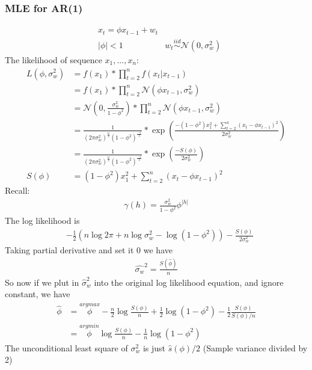 \subsubsection{MLE for AR(1)}
    \begin{align*}
        & x_t = \phi x_{t-1} + w_t\\
        & |\phi| < 1
        & w_t \overset{iid}{\sim} \mathcal{N}(0, \sigma_w^2)
    \end{align*}
The likelihood of sequence $x_1, ..., x_n$: 
    \begin{align*}
        L(\phi, \sigma_w^2) 
        & = f(x_1) * \prod_{t=2}^n f(x_t|x_{t-1})\\
        & = f(x_1) * \prod_{t=2}^n \mathcal{N}(\phi x_{t-1}, \sigma_w^2)\\
        & = \mathcal{N}(0, \frac{\sigma_w^2}{1-\phi^2}) *  \prod_{t=2}^n \mathcal{N}(\phi x_{t-1}, \sigma_w^2) \tag{use $\gamma(0)$}\\
        & = \frac{1}{(2\pi \sigma_w^2)^{\frac{n}{2}} (1-\phi^2)^\frac{-1}{2}} * \exp \left( \frac{ - (1-\phi^2)x_1^2 + \sum_{t=2}^n(x_t - \phi x_{t-1})^2}{2\sigma_w^2}    \right)\\
        & = \frac{1}{(2\pi \sigma_w^2)^{\frac{n}{2}} (1-\phi^2)^\frac{-1}{2}} * \exp \left( \frac{ - S(\phi)}{2\sigma_w^2}    \right) \\
        S(\phi) 
        & =   (1-\phi^2)x_1^2 + \sum_{t=2}^n(x_t - \phi x_{t-1})^2
    \end{align*}
Recall: 
    \begin{align*}
        \gamma(h) = \frac{\sigma_w^2}{1-\phi^2} \phi^{|h|}
    \end{align*}
The log likelihood is 
    \begin{align*}
        & - \frac{1}{2} (n \log 2\pi + n \log \sigma_w^2 - \log (1-\phi^2)) - \frac{S(\phi)}{2\sigma_w^2}
    \end{align*}
Taking partial derivative and set it 0 we have 
    \begin{align*}
        \hat{\sigma_w}^2 = \frac{S(\hat{\phi})}{n}
    \end{align*}
So now if we plut in $\hat{\sigma}_w^2$ into the original log likelihood equation, and ignore constant, we have 
    \begin{align*}
        \hat{\phi} 
        & = \overset{argmax}{\phi} - \frac{n}{2} \log \frac{S(\phi)}{n} + \frac{1}{2} \log (1-\phi^2) - \frac{1}{2}\frac{S(\phi)}{S(\phi)/n} \\
        & =\overset{argmin}{\phi}\log \frac{S(\phi)}{n} -  \frac{1}{n}\log (1-\phi^2) \tag{also divided everything by $n$}
    \end{align*}
The unconditional least square of $\sigma_w^2$ is just $\hat{s}(\phi) / 2$ (Sample variance divided by 2)\\

